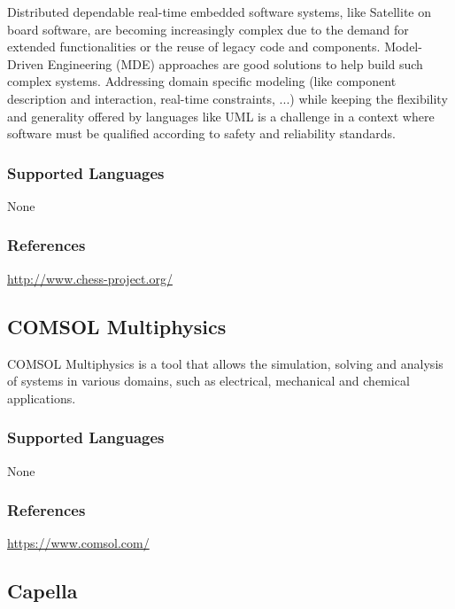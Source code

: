 Distributed dependable real-time embedded software systems, like Satellite on board software, are becoming increasingly complex due to the demand for extended functionalities or the reuse of legacy code and components. Model-Driven Engineering (MDE) approaches are good solutions to help build such complex systems. Addressing domain specific modeling (like component description and interaction, real-time constraints, ...) while keeping the flexibility and generality offered by languages like UML is a challenge in a context where software must be qualified according to safety and reliability standards.

\subsubsection{Supported Languages}

None


\subsubsection{References}

\url{http://www.chess-project.org/}



\subsection{COMSOL Multiphysics}
\label{subsecT:COMSOL}



COMSOL Multiphysics is a tool that allows the simulation, solving and analysis of systems in various domains, such as electrical, mechanical and chemical applications.

\subsubsection{Supported Languages}

None


\subsubsection{References}

\url{https://www.comsol.com/}




\subsection{Capella}
\label{subsecT:Capella}

